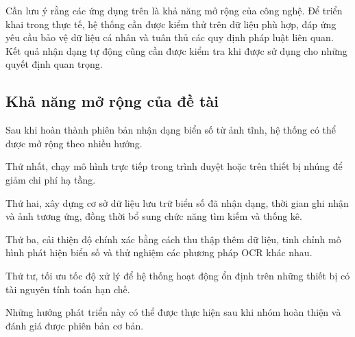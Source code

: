 Cần lưu ý rằng các ứng dụng trên là khả năng mở rộng của công nghệ. Để triển khai trong thực tế, hệ thống cần được kiểm thử trên dữ liệu phù hợp, đáp ứng yêu cầu bảo vệ dữ liệu cá nhân và tuân thủ các quy định pháp luật liên quan. Kết quả nhận dạng tự động cũng cần được kiểm tra khi được sử dụng cho những quyết định quan trọng.

\subsection{Khả năng mở rộng của đề tài}

Sau khi hoàn thành phiên bản nhận dạng biển số từ ảnh tĩnh, hệ thống có thể được mở rộng theo nhiều hướng.

Thứ nhất, chạy mô hình trực tiếp trong trình duyệt hoặc trên thiết bị nhúng để giảm chi phí hạ tầng.

Thứ hai, xây dựng cơ sở dữ liệu lưu trữ biển số đã nhận dạng, thời gian ghi nhận và ảnh tương ứng, đồng thời bổ sung chức năng tìm kiếm và thống kê.

Thứ ba, cải thiện độ chính xác bằng cách thu thập thêm dữ liệu, tinh chỉnh mô hình phát hiện biển số và thử nghiệm các phương pháp OCR khác nhau.

Thứ tư, tối ưu tốc độ xử lý để hệ thống hoạt động ổn định trên những thiết bị có tài nguyên tính toán hạn chế.

Những hướng phát triển này có thể được thực hiện sau khi nhóm hoàn thiện và đánh giá được phiên bản cơ bản.

